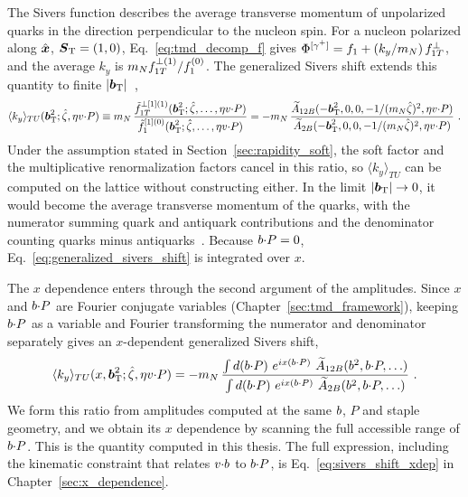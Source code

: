 The Sivers function describes the average transverse momentum of unpolarized quarks in the direction perpendicular to the nucleon spin. For a nucleon polarized along $\hat{\boldsymbol{x}}$, $\boldsymbol{S}_{\mathrm T} = (1,0)$, Eq.~\eqref{eq:tmd_decomp_f} gives $\Phi^{[\gamma^+]} = f_1 + (k_y/m_N)\,f_{1T}^\perp$, and the average $k_y$ is $m_N f_{1T}^{\perp(1)}/f_1^{(0)}$. The generalized Sivers shift extends this quantity to finite $|\boldsymbol{b}_{\mathrm T}|$~\cite{Musch:2011er,Boer:2011xd},
\begingroup\small
\begin{equation}
  \langle k_y\rangle_{TU}(\boldsymbol{b}_{\mathrm T}^2;{\hat \zeta},\eta v{\cdot} P) \equiv m_N\,\frac{\tilde f_{1T}^{\perp[1](1)}(\boldsymbol{b}_{\mathrm T}^2;{\hat \zeta},\ldots,\eta v{\cdot} P)}{\tilde f_1^{[1](0)}(\boldsymbol{b}_{\mathrm T}^2;{\hat \zeta},\ldots,\eta v{\cdot} P)}
  = -m_N\,\frac{\widetilde{A}_{12B}(-\boldsymbol{b}_{\mathrm T}^2,0,0,-1/(m_N{\hat \zeta})^2,\eta v{\cdot} P)}{\widetilde{A}_{2B}(-\boldsymbol{b}_{\mathrm T}^2,0,0,-1/(m_N{\hat \zeta})^2,\eta v{\cdot} P)} \ .
  \label{eq:generalized_sivers_shift}
\end{equation}
\endgroup
Under the assumption stated in Section~\ref{sec:rapidity_soft}, the soft factor and the multiplicative renormalization factors cancel in this ratio, so $\langle k_y\rangle_{TU}$ can be computed on the lattice without constructing either. In the limit $|\boldsymbol{b}_{\mathrm T}|\to 0$, it would become the average transverse momentum of the quarks, with the numerator summing quark and antiquark contributions and the denominator counting quarks minus antiquarks~\cite{Boussarie:2023izj}. Because $b{\cdot} P = 0$, Eq.~\eqref{eq:generalized_sivers_shift} is integrated over $x$.

The $x$ dependence enters through the second argument of the amplitudes. Since $x$ and $b{\cdot} P$ are Fourier conjugate variables (Chapter~\ref{sec:tmd_framework}), keeping $b{\cdot} P$ as a variable and Fourier transforming the numerator and denominator separately gives an $x$-dependent generalized Sivers shift,
\begin{equation}
  \langle k_y\rangle_{TU}(x,\vprp{b}^2;\zetahat,\eta v\tcdot P) = -\mN\,\frac{\int d(\bvec\tcdot P)\ e^{ix(\bvec\tcdot P)}\ \tAmp_{12B}(\bvec^2,\bvec\tcdot P,\ldots)}{\int d(\bvec\tcdot P)\ e^{ix(\bvec\tcdot P)}\ \tAmp_{2B}(\bvec^2,\bvec\tcdot P,\ldots)} \ .
\end{equation}
We form this ratio from amplitudes computed at the same $b$, $P$ and staple geometry, and we obtain its $x$ dependence by scanning the full accessible range of $b{\cdot} P$. This is the quantity computed in this thesis. The full expression, including the kinematic constraint that relates $v{\cdot}b$ to $b{\cdot} P$, is Eq.~\eqref{eq:sivers_shift_xdep} in Chapter~\ref{sec:x_dependence}.

